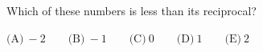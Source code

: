 Which of these numbers is less than its reciprocal?



$\text{(A)}\ -2 \qquad \text{(B)}\ -1 \qquad \text{(C)}\ 0 \qquad \text{(D)}\ 1 \qquad \text{(E)}\ 2$
